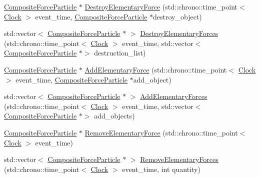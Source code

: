 \begin{DoxyCompactItemize}
\item 
\mbox{\hyperlink{classCompositeForceParticle}{Composite\+Force\+Particle}} $\ast$ \mbox{\hyperlink{classCompositeForceParticle_af12bbef12781e7b72a4569609f751af6}{Destroy\+Elementary\+Force}} (std\+::chrono\+::time\+\_\+point$<$ \mbox{\hyperlink{universe_8h_a0ef8d951d1ca5ab3cfaf7ab4c7a6fd80}{Clock}} $>$ event\+\_\+time, \mbox{\hyperlink{classCompositeForceParticle}{Composite\+Force\+Particle}} $\ast$destroy\+\_\+object)
\item 
std\+::vector$<$ \mbox{\hyperlink{classCompositeForceParticle}{Composite\+Force\+Particle}} $\ast$ $>$ \mbox{\hyperlink{classCompositeForceParticle_af07d8607737f7881aac6314313d800e3}{Destroy\+Elementary\+Forces}} (std\+::chrono\+::time\+\_\+point$<$ \mbox{\hyperlink{universe_8h_a0ef8d951d1ca5ab3cfaf7ab4c7a6fd80}{Clock}} $>$ event\+\_\+time, std\+::vector$<$ \mbox{\hyperlink{classCompositeForceParticle}{Composite\+Force\+Particle}} $\ast$$>$ destruction\+\_\+list)
\item 
\mbox{\hyperlink{classCompositeForceParticle}{Composite\+Force\+Particle}} $\ast$ \mbox{\hyperlink{classCompositeForceParticle_aed3a7ebcb98626c564dde2d54d45ff03}{Add\+Elementary\+Force}} (std\+::chrono\+::time\+\_\+point$<$ \mbox{\hyperlink{universe_8h_a0ef8d951d1ca5ab3cfaf7ab4c7a6fd80}{Clock}} $>$ event\+\_\+time, \mbox{\hyperlink{classCompositeForceParticle}{Composite\+Force\+Particle}} $\ast$add\+\_\+object)
\item 
std\+::vector$<$ \mbox{\hyperlink{classCompositeForceParticle}{Composite\+Force\+Particle}} $\ast$ $>$ \mbox{\hyperlink{classCompositeForceParticle_ad0e97ed38272c7861d162afdf0db33c7}{Add\+Elementary\+Forces}} (std\+::chrono\+::time\+\_\+point$<$ \mbox{\hyperlink{universe_8h_a0ef8d951d1ca5ab3cfaf7ab4c7a6fd80}{Clock}} $>$ event\+\_\+time, std\+::vector$<$ \mbox{\hyperlink{classCompositeForceParticle}{Composite\+Force\+Particle}} $\ast$$>$ add\+\_\+objects)
\item 
\mbox{\hyperlink{classCompositeForceParticle}{Composite\+Force\+Particle}} $\ast$ \mbox{\hyperlink{classCompositeForceParticle_afe5738b3ba1382dad085fa1ef39963b3}{Remove\+Elementary\+Force}} (std\+::chrono\+::time\+\_\+point$<$ \mbox{\hyperlink{universe_8h_a0ef8d951d1ca5ab3cfaf7ab4c7a6fd80}{Clock}} $>$ event\+\_\+time)
\item 
std\+::vector$<$ \mbox{\hyperlink{classCompositeForceParticle}{Composite\+Force\+Particle}} $\ast$ $>$ \mbox{\hyperlink{classCompositeForceParticle_a1bfa61cec4f5a8436c1a188312ba8f45}{Remove\+Elementary\+Forces}} (std\+::chrono\+::time\+\_\+point$<$ \mbox{\hyperlink{universe_8h_a0ef8d951d1ca5ab3cfaf7ab4c7a6fd80}{Clock}} $>$ event\+\_\+time, int quantity)

\end{DoxyCompactItemize}
